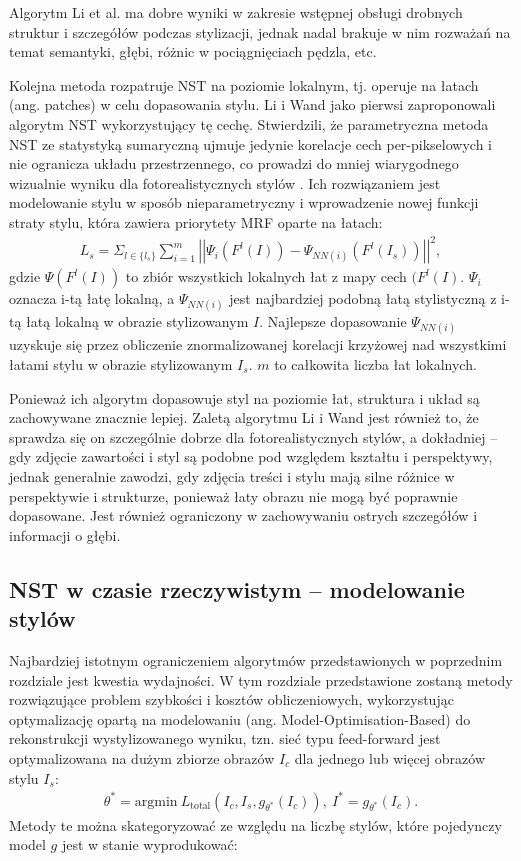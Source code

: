 \documentclass[12pt]{article}
\begin{document}
Algorytm Li et al. ma dobre wyniki w zakresie wstępnej obsługi drobnych struktur i szczegółów podczas stylizacji, jednak nadal brakuje w nim rozważań na temat semantyki, głębi, różnic w pociągnięciach pędzla, etc.

Kolejna metoda rozpatruje NST na poziomie lokalnym, tj. operuje na łatach (ang. patches) w celu dopasowania stylu. Li i Wand jako pierwsi zaproponowali algorytm NST wykorzystujący tę cechę. Stwierdzili, że parametryczna metoda NST ze statystyką sumaryczną ujmuje jedynie korelacje cech per-pikselowych i nie ogranicza układu przestrzennego, co prowadzi do mniej wiarygodnego wizualnie wyniku dla fotorealistycznych stylów \cite{38}. Ich rozwiązaniem jest modelowanie stylu w sposób nieparametryczny i wprowadzenie nowej funkcji straty stylu, która zawiera priorytety MRF oparte na łatach:
\begin{align*}
    L_s = \Sigma_{l\in \{l_s\}}\sum_{i=1}^{m}\left|\left|\Psi_i\left(F^l(I)\right)-\Psi_{NN(i)}\left(F^l\left(I_s\right)\right)\right|\right|^2,
\end{align*}
gdzie $\Psi(F^l(I))$ to zbiór wszystkich lokalnych łat z mapy cech $(F^l(I)$. $\Psi_i$ oznacza i-tą łatę lokalną, a $\Psi_{NN(i)}$ jest najbardziej podobną łatą stylistyczną z i-tą łatą lokalną w obrazie stylizowanym $I$. Najlepsze dopasowanie $\Psi_{NN(i)}$ uzyskuje się przez obliczenie znormalizowanej korelacji krzyżowej nad wszystkimi łatami stylu w obrazie stylizowanym $I_s$. $m $ to całkowita liczba łat lokalnych.

Ponieważ ich algorytm dopasowuje styl na poziomie łat, struktura i układ są zachowywane znacznie lepiej. Zaletą algorytmu Li i Wand jest również to, że sprawdza się on szczególnie dobrze dla fotorealistycznych stylów, a dokładniej – gdy zdjęcie zawartości i styl są podobne pod względem kształtu i perspektywy, jednak generalnie zawodzi, gdy zdjęcia treści i stylu mają silne różnice w perspektywie i strukturze, ponieważ łaty obrazu nie mogą być poprawnie dopasowane. Jest również ograniczony w zachowywaniu ostrych szczegółów i informacji o głębi.

\subsection{NST w czasie rzeczywistym – modelowanie stylów}

\indent

Najbardziej istotnym ograniczeniem algorytmów przedstawionych w poprzednim rozdziale jest kwestia wydajności. W tym rozdziale przedstawione zostaną metody rozwiązujące problem szybkości i kosztów obliczeniowych, wykorzystując optymalizację opartą na modelowaniu (ang. Model-Optimisation-Based) do rekonstrukcji wystylizowanego wyniku, tzn. sieć typu feed-forward jest optymalizowana na dużym zbiorze obrazów $I_c$ dla jednego lub więcej obrazów stylu $I_s$:
\begin{align*}
    \theta^*=\text{argmin}\ L_{\text{total}}\left(I_c,I_s,g_{\theta^*}\left(I_c\right)\right),\ I^*=g_{\theta^*}\left(I_c\right).
\end{align*}
Metody te można skategoryzować ze względu na liczbę stylów, które pojedynczy model $g$ jest w stanie wyprodukować:
\end{document}
